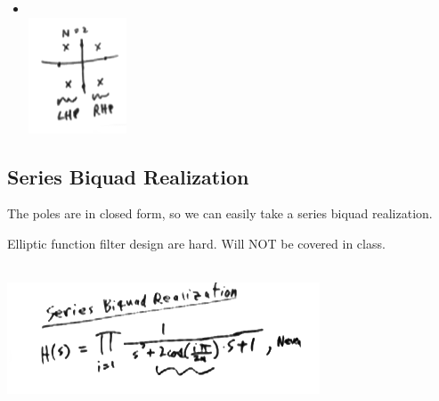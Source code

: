 \begin{itemize}
\item{\\
\includegraphics[scale=0.9]{frames/15i}
}

\end{itemize}

\subsection*{Series Biquad Realization}

The poles are in closed form, so we can easily take a series biquad realization.


Elliptic function filter design are hard. Will NOT be covered in class. 


\\
\includegraphics[scale=0.9]{frames/15j}\\
